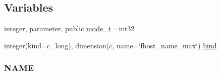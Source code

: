 \subsection*{Variables}
\begin{DoxyCompactItemize}
\item 
integer, parameter, public \mbox{\hyperlink{namespacem__system_abdb5cc27c945379d844db4830d499050}{mode\+\_\+t}} =int32
\item 
integer(kind=c\+\_\+long), dimension(c, name=\char`\"{}fhost\+\_\+name\+\_\+max\char`\"{}) \mbox{\hyperlink{namespacem__system_a7d597052e9d23e2d899e6f81a4509c70}{bind}}
\begin{DoxyCompactList}\small\item\em \subsubsection*{N\+A\+ME}


\end{DoxyCompactList}
\end{DoxyCompactItemize}
